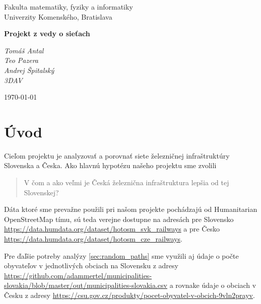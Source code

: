 \documentclass[12pt,a4paper]{article}
\begin{document}
\begin{titlepage}
  \centering

  {\large
    Fakulta matematiky, fyziky a informatiky\\
    Univerzity Komenského, Bratislava
  }\par

  \vspace{4cm}

  {\bfseries\LARGE
    Projekt z vedy o sieťach
  }\par

  \vspace{0.5cm}

  \vfill

  \begin{flushleft}
    {\itshape
      Tomáš Antal\\
      Teo Pazera\\
      Andrej Špitalský \\
      3DAV
    }
  \end{flushleft}

  \begin{flushright}
    \today
  \end{flushright}

\end{titlepage}

\newpage

\section{Úvod}
Cieľom projektu je analyzovať a porovnať siete železničnej infraštruktúry Slovenska a Česka. Ako hlavnú hypotézu našeho projektu sme zvolili \begin{quote}
    V čom a ako veľmi je Česká železnična infraštruktura lepšia od tej Slovenskej?
\end{quote} 
Dáta ktoré sme prevažne použili pri našom projekte pochádzajú od Humanitarian OpenStreetMap tímu, sú teda verejne dostupne na adresách pre Slovensko \url{https://data.humdata.org/dataset/hotosm_svk_railways} a pre Česko \url{https://data.humdata.org/dataset/hotosm_cze_railways}.

Pre ďaľšie potreby analýzy \ref{sec:random_paths} sme využili aj údaje o počte obyvateľov v jednotlivých obciach na Slovensku z adresy \url{https://github.com/adammertel/municipalities-slovakia/blob/master/out/municipalities-slovakia.csv}
a rovnake údaje o obciach v Česku z adresy \url{https://csu.gov.cz/produkty/pocet-obyvatel-v-obcich-9vln2prayv}. 



\newpage

\newpage

\newpage

\newpage

\end{document}

